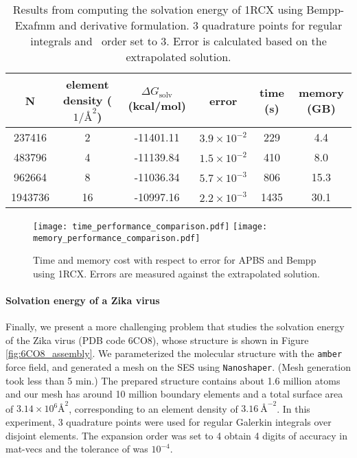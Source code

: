 \begin{table*}[]
    \centering
    \begin{tabular}{cc|cc|cc}
    N       & element density ($1/ \si{\angstrom}^2$) & $\Delta G_{\mathrm{solv}}$ (kcal/mol) & error               & time (s) & memory (GB) \\ \hline
    237416  & 2                                       & -11401.11                             & $3.9\times 10^{-2}$ & 229      & 4.4         \\
    483796  & 4                                       & -11139.84                             & $1.5\times 10^{-2}$ & 410      & 8.0         \\
    962664  & 8                                       & -11036.34                             & $5.7\times 10^{-3}$ & 806      & 15.3        \\
    1943736 & 16                                      & -10997.16                             & $2.2\times 10^{-3}$ & 1435     & 30.1       
    \end{tabular}
    \caption{Results from computing the solvation energy of 1RCX using Bempp-Exafmm and derivative formulation.
    3 quadrature points for regular integrals and \fmm\ order set to 3.
    Error is calculated based on the extrapolated solution.}
    \label{tab:1RCX_bempp}
\end{table*}

\begin{figure*}
    \begin{center}
        \texttt{[image: time\_performance\_comparison.pdf]}
        \label{fig:time_performance_comparsion}\qquad
        \texttt{[image: memory\_performance\_comparison.pdf]}
        \label{fig:memory_performance_comparison}
    \end{center}
    \caption{Time and memory cost with respect to error for APBS and Bempp using 1RCX.
    Errors are measured against the extrapolated solution.
    }
    \label{fig:performance_comparison_apbs}
\end{figure*}

\paragraph{Solvation energy of a Zika virus} \label{result_zika}

Finally, we present a more challenging problem that studies the solvation energy of the Zika virus (PDB code 6CO8), whose structure \cite{sevvana2018refinement} is shown in Figure \ref{fig:6CO8_assembly}.
We parameterized the molecular structure with the \texttt{amber} \cite{caseAmberBiomolecularSimulation2005} force field, and generated a mesh on the SES using \texttt{Nanoshaper}. (Mesh generation took less than 5 min.)
The prepared structure contains about 1.6 million atoms and our mesh has around 10 million boundary elements and a total surface area of $3.14\times 10^6 {\si{\angstrom}}^{2}$, corresponding to an element density of $\qty{3.16}{\angstrom}^{-2}$.
In this experiment, 3 quadrature points were used for regular Galerkin integrals over disjoint elements.
The \fmm expansion order was set to 4 obtain 4 digits of accuracy in mat-vecs and the tolerance of \gmres was $10^{-4}$.

